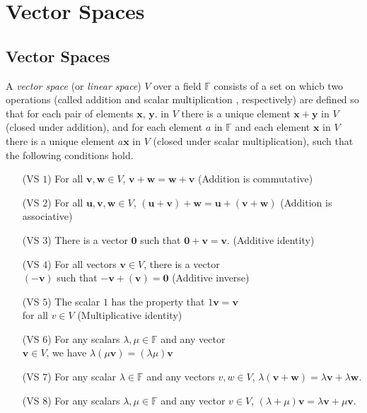 \section{Vector Spaces}
\subsection{Vector Spaces}
\begin{defi}
    A \emph{vector space} (or \emph{linear space}) $V$ over a field $\mathbb{F}$
    consists of a set on whicb two operations (called addition and scalar
    multiplication , respectively) are defined so that for each pair of elements
    $\mathbf{x}$, $\mathbf{y}$. in $V$ there is a unique element $\mathbf{x +
    y}$ in $V$ (closed under addition), and for each element $a$ in $\mathbb{F}$
    and each element $\mathbf{x}$ in $V$ there is a unique element $a\mathbf{x}$
    in $V$ (closed under scalar multiplication), such that the following
    conditions hold. 
    \begin{enumerate}
        \item[(VS $1$)] For all $\mathbf{v}, \mathbf{w} \in V$, $\mathbf{v} + \mathbf{w} = \mathbf{w} + \mathbf{v}$ \hfill
        (Addition is commutative)
        \item[(VS $2$)]  For all $\mathbf{u}, \mathbf{v}, \mathbf{w} \in V$, $(\mathbf{u} +
        \mathbf{v}) + \mathbf{w} = \mathbf{u} + (\mathbf{v} + \mathbf{w})$
        \hfill (Addition is associative)
        \item[(VS $3$)] There is a vector $\mathbf{0}$ such that $\mathbf{0}+\mathbf{v}
        = \mathbf{v}$. \hfill (Additive identity)
        \item[(VS $4$)] For all vectors $\mathbf{v}\in V$, there is a vector \\
        $(-\mathbf{v})$ such that $\mathbf{-v}
        + (\mathbf{v}) = \mathbf{0}$ \hfill (Additive inverse)
        \item[(VS $5$)] The scalar $1$ has the property that $1\mathbf{v} = \mathbf{v}$ \\
        for all $v \in V$ \hfill (Multiplicative identity)
        \item[(VS $6$)] For any scalars $\lambda, \mu \in \mathbb{F}$ and any vector \\
        $\mathbf{v} \in V$, we have $\lambda(\mu\mathbf{v}) =
        (\lambda\mu)\mathbf{v}$ \hfill 
        \item[(VS $7$)] For any scalar $\lambda \in \mathbb{F}$ and any vectors
        $v, w \in V$, $\lambda(\mathbf{v + w}) = \lambda\mathbf{v} + \lambda\mathbf{w}$.
        \item[(VS $8$)]For any scalars $\lambda, \mu \in \mathbb{F}$ and any vector $v \in
        V$, $(\lambda + \mu)\mathbf{v} = \lambda\mathbf{v} + \mu\mathbf{v}$.
    \end{enumerate}
\end{defi}

